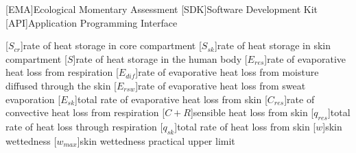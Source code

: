 \begin{acronym}[longest]
[EMA]{Ecological Momentary Assessment}
[SDK]{Software Development Kit}
[API]{Application Programming Interface}

[$S_{cr}$]{rate of heat storage in core compartment}
[$S_{sk}$]{rate of heat storage in skin compartment}
[$S$]{rate of heat storage in the human body}
[$E_{res}$]{rate of evaporative heat loss from respiration}
[$E_{dif}$]{rate of evaporative heat loss from moisture diffused through the skin}
[$E_{rsw}$]{rate of evaporative heat loss from sweat evaporation}
[$E_{sk}$]{total rate of evaporative heat loss from skin}
[$C_{res}$]{rate of convective heat loss from respiration}
[$C + R$]{sensible heat loss from skin}
[$q_{res}$]{total rate of heat loss through respiration}
[$q_{sk}$]{total rate of heat loss from skin}
[$w$]{skin wettedness}
[$w_{max}$]{skin wettedness practical upper limit}

\end{acronym}
\renewcommand{\baselinestretch}{1}\normalsize
